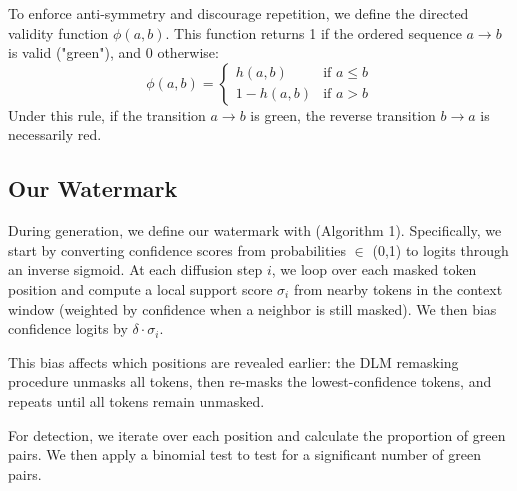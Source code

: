 To enforce anti-symmetry and discourage repetition, we define the directed validity function $\phi(a, b)$. This function returns 1 if the ordered sequence $a \rightarrow b$ is valid ("green"), and 0 otherwise:
\begin{equation}
    \phi(a, b) = 
    \begin{cases} 
        h(a, b) & \text{if } a \le b \\
        1 - h(a, b) & \text{if } a > b 
    \end{cases}
\end{equation}
Under this rule, if the transition $a \rightarrow b$ is green, the reverse transition $b \rightarrow a$ is necessarily red.
\subsection{Our Watermark}
\noindent
\begin{minipage}[t]{0.38\textwidth}
\vspace{0pt}
\small
\raggedright
During generation, we define our watermark with (Algorithm 1). Specifically, we start by converting confidence scores from probabilities $\in$ (0,1) to logits through an inverse sigmoid. At each diffusion step $i$, we loop over each masked token position and compute a local support score $\sigma_i$ from nearby tokens in the context window (weighted by confidence when a neighbor is still masked). We then bias confidence logits by $\delta \cdot \sigma_i$.

This bias affects which positions are revealed earlier: the DLM remasking procedure unmasks all tokens, then re-masks the lowest-confidence tokens, and repeats until all tokens remain unmasked.

For detection, we iterate over each position and calculate the proportion of green pairs. We then apply a binomial test to test for a significant number of green pairs.

\end{minipage}
